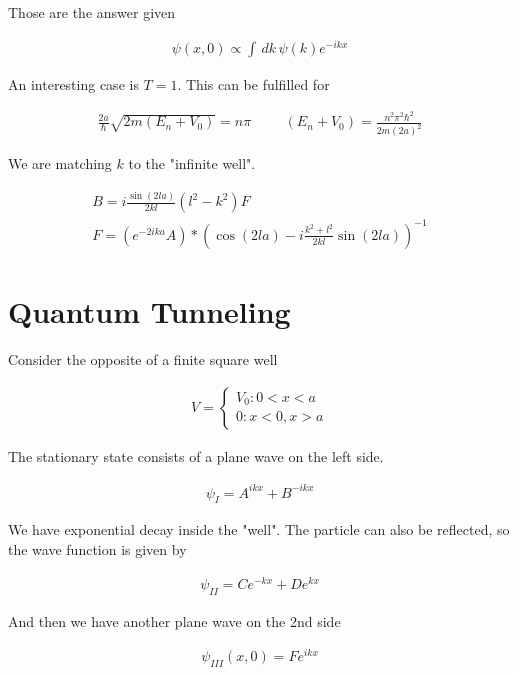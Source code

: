\documentclass[fleqn]{report}
\newcommand{\hp}{\hspace{1cm}}
\newcommand{\equations} [1] {
\begin{gather*}
#1
\end{gather*}
}
\begin{document}
Those are the answer given 
\equations{
    \psi(x, 0)
    \propto 
    \int \, dk \, 
    \psi(k) e^{-ikx}
}

An interesting case is $T=1$. This can be fulfilled for 

\equations{
    \frac{2a}{\hbar}
    \sqrt{2m (E_n + V_0)}
    =
    n \pi
    \hp 
    (E_n + V_0)
    =
    \frac{n^2 \pi^2 \hbar^2}{2m (2a)^2}
}

We are matching $k$ to the "infinite well". 

\equations{
    B 
    =
    i \frac{\sin(2la)}{2kl}
    (l^2 - k^2) F 
    \\
    F 
    =
    (e^{-2ika} A)
    * 
    \left(
        \cos(2la)
        -
        i \frac{k^2 + l^2}{2kl}
        \sin(2la)
    \right)^{-1}
}

\section{Quantum Tunneling}
Consider the opposite of a finite square well 
\equations{
    V =
    \begin{cases}
        V_0 : 0 < x < a 
        \\
        0 : x < 0, x > a
    \end{cases}
}

The stationary state consists of a plane wave on the left side.
\equations{
    \psi_{I}
    =
    A^{ikx}
    +
    B^{-ikx}
}

We have exponential decay inside the "well".
The particle can also be reflected, so the wave function is 
given by 
\equations{
    \psi_{II}
    =
    Ce^{-kx}
    +
    De^{kx}
}

And then we have another plane wave on the 2nd side 
\equations{
    \psi_{III}(x, 0)
    =
    F e^{ikx}
}
\end{document}
